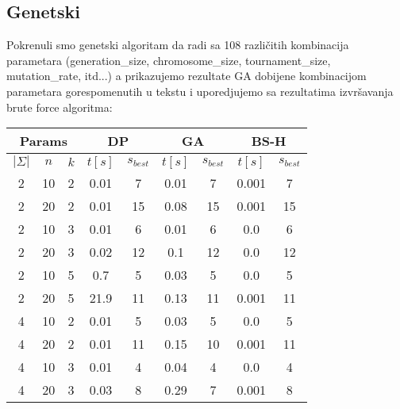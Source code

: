 \documentclass{article}
\begin{document}
    \subsection{Genetski}
    Pokrenuli smo genetski algoritam da radi sa 108 različitih kombinacija parametara (generation\_size, chromosome\_size, tournament\_size, mutation\_rate, itd...) a prikazujemo rezultate GA dobijene kombinacijom parametara gorespomenutih u tekstu i uporedjujemo sa rezultatima izvršavanja brute force algoritma:

    \begin{center}
        \begin{tabular}{| c c c | c c | c c | c c |}
            \hline
            \multicolumn{3}{|c}{Params} & \multicolumn{2}{|c}{DP} & \multicolumn{2}{|c|}{GA} & \multicolumn{2}{|c|}{BS-H} \\
            \hline
            $|\Sigma|$ & $n$ & $k$ & $t[s]$ & $s_{best}$ & $t[s]$ & $s_{best}$ & $t[s]$ & $s_{best}$ \\
            \hline
            2          & 10  & 2   & 0.01   & 7          & 0.01   & 7          & 0.001  & 7          \\
            \hline
            2          & 20  & 2   & 0.01   & 15         & 0.08   & 15         & 0.001  & 15         \\
            \hline
            2          & 10  & 3   & 0.01   & 6          & 0.01   & 6          & 0.0    & 6          \\
            \hline
            2          & 20  & 3   & 0.02   & 12         & 0.1    & 12         & 0.0    & 12         \\
            \hline
            2          & 10  & 5   & 0.7    & 5          & 0.03   & 5          & 0.0    & 5          \\
            \hline
            2          & 20  & 5   & 21.9   & 11         & 0.13   & 11         & 0.001  & 11         \\
            \hline
            4          & 10  & 2   & 0.01   & 5          & 0.03   & 5          & 0.0    & 5          \\
            \hline
            4          & 20  & 2   & 0.01   & 11         & 0.15   & 10         & 0.001  & 11         \\
            \hline
            4          & 10  & 3   & 0.01   & 4          & 0.04   & 4          & 0.0    & 4          \\
            \hline
            4          & 20  & 3   & 0.03   & 8          & 0.29   & 7          & 0.001  & 8          \\

\end{tabular}
\end{center}
\end{document}
